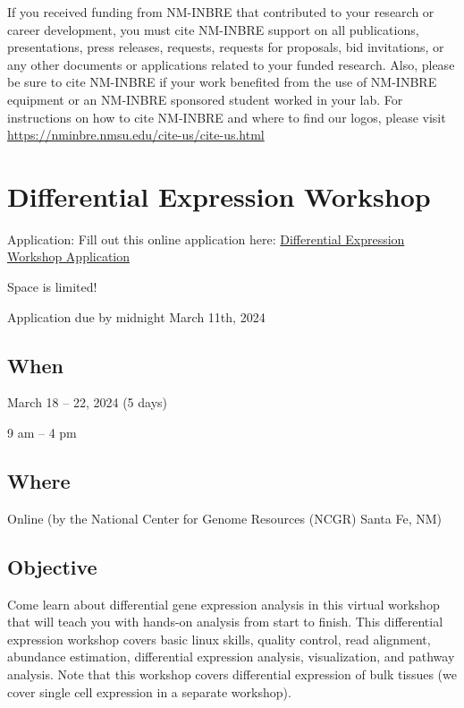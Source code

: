 \documentclass[
]{book}
\begin{document}
If you received funding from NM-INBRE that contributed to your research or career development, you must cite NM-INBRE support on all publications, presentations, press releases, requests, requests for proposals, bid invitations, or any other documents or applications related to your funded research. Also, please be sure to cite NM-INBRE if your work benefited from the use of NM-INBRE equipment or an NM-INBRE sponsored student worked in your lab.
For instructions on how to cite NM-INBRE and where to find our logos, please visit \url{https://nminbre.nmsu.edu/cite-us/cite-us.html}

\hypertarget{differential-expression-workshop}{%
\chapter*{Differential Expression Workshop}\label{differential-expression-workshop}}

Application: Fill out this online application here:
\href{https://docs.google.com/forms/d/e/1FAIpQLScpoKxE0yAnCK3yOl5hBde7MtOWCOeXYxvjBfWyDcA9hHDGrw/viewform}{Differential Expression Workshop Application}

Space is limited!

Application due by midnight March 11th, 2024

\hypertarget{when-4}{%
\section*{When}\label{when-4}}

March 18 -- 22, 2024 (5 days)

9 am -- 4 pm

\hypertarget{where-3}{%
\section*{Where}\label{where-3}}

Online (by the National Center for Genome Resources (NCGR) Santa Fe, NM)

\hypertarget{objective-3}{%
\section*{Objective}\label{objective-3}}

Come learn about differential gene expression analysis in this virtual workshop that will teach you with hands-on analysis from start to finish. This differential expression workshop covers basic linux skills, quality control, read alignment, abundance estimation, differential expression analysis, visualization, and pathway analysis. Note that this workshop covers differential expression of bulk tissues (we cover single cell expression in a separate workshop).
\end{document}
